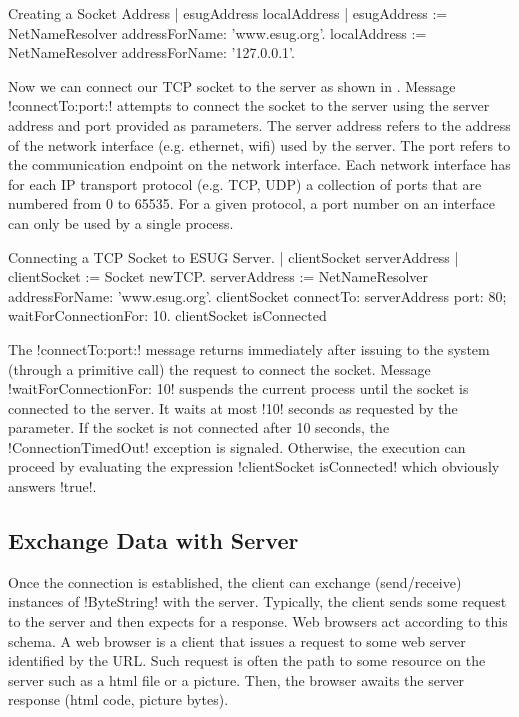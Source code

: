 \documentclass[a4paper,10pt,twoside]{book}
\begin{document}

\begin{script}[creatingSocketAddress]{Creating a Socket Address}
| esugAddress localAddress |
esugAddress := NetNameResolver addressForName: 'www.esug.org'.
localAddress := NetNameResolver addressForName: '127.0.0.1'.
\end{script}

Now we can connect our TCP socket to the server as shown in .
Message \ct!connectTo:port:! attempts to connect the socket to the server using the server address and port provided as parameters.
The server address refers to the address of the network interface (e.g. ethernet, wifi) used by the server.
The port refers to the communication endpoint on the network interface. 
Each network interface has for each IP transport protocol (e.g. TCP, UDP) a collection of ports that are numbered from 0 to 65535.
For a given protocol, a port number on an interface can only be used by a single process.

\begin{script}[connectingTcpSocket]{Connecting a TCP Socket to ESUG Server.}
| clientSocket serverAddress |
clientSocket := Socket newTCP.
serverAddress := NetNameResolver addressForName: 'www.esug.org'.
clientSocket 
	connectTo: serverAddress port: 80;
	waitForConnectionFor: 10.
clientSocket isConnected
\end{script}

The \ct!connectTo:port:!  message returns immediately after issuing to the system (through a primitive call) the request to connect the socket.
Message \ct!waitForConnectionFor: 10! suspends the current process until the socket is connected to the server.
It waits at most \ct!10! seconds as requested by the parameter.
If the socket is not connected after 10 seconds, the \ct!ConnectionTimedOut! exception is signaled. 
Otherwise, the execution can proceed by evaluating the expression \ct!clientSocket isConnected! which obviously answers \ct!true!.



\subsection{Exchange Data with Server}
\label{sec:exchangeData}
Once the connection is established, the client can exchange (send/receive) instances of \ct!ByteString! with the server.
Typically, the client sends some request to the server and then expects for a response.
Web browsers act according to this schema.
A web browser is a client that issues a request to some web server identified by the URL.
Such request is often the path to some resource on the server such as a html file or a picture.
Then, the browser awaits the server response (\eg html code, picture bytes).
\end{document}
